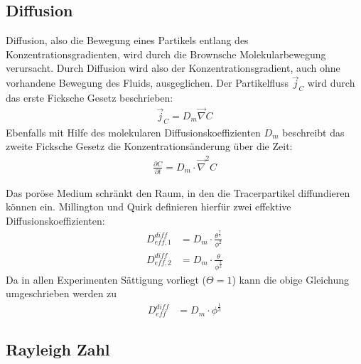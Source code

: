
\subsection{Diffusion}
\label{sec:diff}
Diffusion, also die Bewegung eines Partikels entlang des Konzentrationsgradienten, wird durch die Brownsche Molekularbewegung verursacht. Durch Diffusion wird also der Konzentrationsgradient, auch ohne vorhandene Bewegung des Fluids, ausgeglichen. Der Partikelfluss $\vec{j}_C$ wird durch das erste Ficksche Gesetz beschrieben:
\begin{align}
 \vec{j}_C = D_m \vec{\nabla} C
\end{align}
Ebenfalls mit Hilfe des molekularen Diffusionskoeffizienten $D_m$ beschreibt das zweite Ficksche Gesetz die Konzentrationsänderung über die Zeit:
\begin{align}
 \frac{\partial C}{\partial t} = D_m \cdot \vec{\nabla}^2 C
\end{align}

Das poröse Medium schränkt den Raum, in den die Tracerpartikel diffundieren können ein. Millington und Quirk \citeyearpar{milli-quir} definieren hierfür zwei 
effektive Diffusionskoeffizienten:
\begin{align}
 D_{eff, 1}^{diff} &= D_m \cdot \frac{\theta^{\frac{7}{3}}}{\phi^2} \\
 D_{eff, 2}^{diff} &= D_m \cdot \frac{\theta}{              \phi^\frac{3}{2}}
\end{align}
Da in allen Experimenten Sättigung vorliegt \mbox{($\Theta = 1$)} kann die obige Gleichung umgeschrieben werden zu
\begin{align}
 D_{eff}^{diff} &= D_m \cdot \phi^{\frac{1}{3}}
 \label{eq:Deff}
\end{align}

\subsection{Rayleigh Zahl}
\label{sec:ray}

